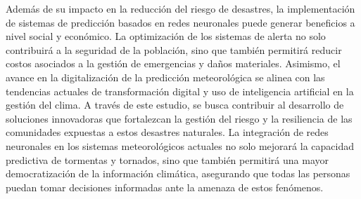 \documentclass{article}
\begin{document}
Además de su impacto en la reducción del riesgo de desastres, la implementación de sistemas de predicción basados en redes neuronales puede generar beneficios a nivel social y económico. La optimización de los sistemas de alerta no solo contribuirá a la seguridad de la población, sino que también permitirá reducir costos asociados a la gestión de emergencias y daños materiales. Asimismo, el avance en la digitalización de la predicción meteorológica se alinea con las tendencias actuales de transformación digital y uso de inteligencia artificial en la gestión del clima.
A través de este estudio, se busca contribuir al desarrollo de soluciones innovadoras que fortalezcan la gestión del riesgo y la resiliencia de las comunidades expuestas a estos desastres naturales. La integración de redes neuronales en los sistemas meteorológicos actuales no solo mejorará la capacidad predictiva de tormentas y tornados, sino que también permitirá una mayor democratización de la información climática, asegurando que todas las personas puedan tomar decisiones informadas ante la amenaza de estos fenómenos.
\end{document}
